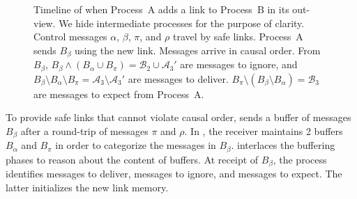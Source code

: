 %     

\begin{figure}
  \begin{center}
    
    \caption{\label{fig:timelineproof}\label{fig:timeline}Timeline of
      \RPCBROADCAST when Process~A adds a link to Process~B in its out-view. We
      hide intermediate processes for the purpose of clarity. Control messages
      $\alpha$, $\beta$, $\pi$, and $\rho$ travel by safe links. Process~A sends
      $B_\beta$ using the new link. Messages arrive in causal order. From 
      $B_\beta$,
      $B_\beta \wedge (B_\alpha \cup B_\pi) = \mathcal{B}_2 \cup \mathcal{A}_3'$
      are messages to ignore, and
      $B_\beta \setminus B_\alpha \setminus B_\pi = \mathcal{A}_3\setminus
      \mathcal{A}_3'$
      are messages to deliver.
      $B_\pi \setminus (B_\beta \setminus B_\alpha) = \mathcal{B}_3$ are
      messages to expect from Process~A.}
  \end{center}
\end{figure}


To provide safe links that cannot violate causal order, \PCBROADCAST sends a
buffer of messages $B_\beta$ after a round-trip of messages $\pi$ and $\rho$. In
\RPCBROADCAST, the receiver maintains 2 buffers $B_\alpha$ and $B_\pi$ in order
to categorize the messages in $B_\beta$. \RPCBROADCAST interlaces the buffering
phases to reason about the content of buffers. At receipt of $B_\beta$, the
process identifies messages to deliver, messages to ignore, and messages to
expect. The latter initializes the new link memory.




\begin{lemma}
\end{lemma}


